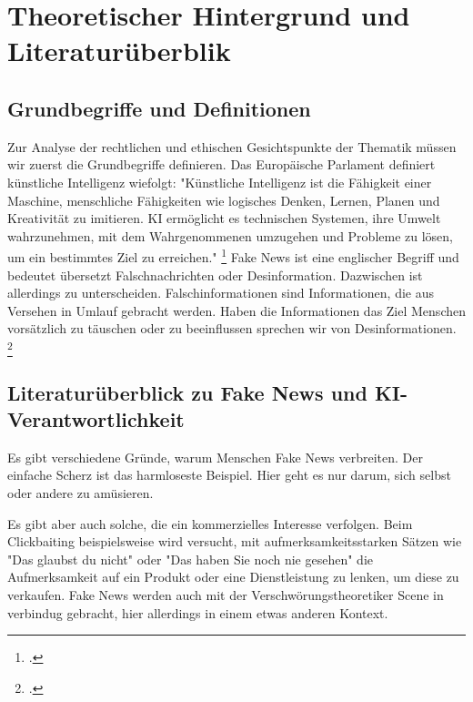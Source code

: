 \documentclass[Thesis.tex]{subfiles}
\begin{document}
\section{Theoretischer Hintergrund und Literaturüberblik}

\subsection{Grundbegriffe und Definitionen}
Zur Analyse der rechtlichen und ethischen Gesichtspunkte der Thematik müssen wir zuerst die Grundbegriffe definieren. 
Das Europäische Parlament definiert künstliche Intelligenz wiefolgt: "Künstliche Intelligenz ist die Fähigkeit einer Maschine,
menschliche Fähigkeiten wie logisches Denken, Lernen, Planen und Kreativität zu imitieren.
\ac{KI} ermöglicht es technischen Systemen, ihre Umwelt wahrzunehmen, mit dem Wahrgenommenen umzugehen
und Probleme zu lösen, um ein bestimmtes Ziel zu erreichen." \footcite{Parlament2020}
Fake News ist eine englischer Begriff und bedeutet übersetzt Falschnachrichten oder Desinformation. Dazwischen ist allerdings zu unterscheiden.
Falschinformationen sind Informationen, die aus Versehen in Umlauf gebracht werden.
Haben die Informationen das Ziel Menschen vorsätzlich zu täuschen oder zu beeinflussen sprechen wir von Desinformationen. \footcite{Bundesregierung2023Desinformation}

\subsection{Literaturüberblick zu Fake News und KI-Verantwortlichkeit}
Es gibt verschiedene Gründe, warum Menschen Fake News verbreiten. 
Der einfache Scherz ist das harmloseste Beispiel. Hier geht es nur darum, sich selbst
oder andere zu amüsieren.

Es gibt aber auch solche, die ein kommerzielles Interesse verfolgen. 
Beim Clickbaiting beispielsweise wird versucht, mit aufmerksamkeitsstarken Sätzen
wie "Das glaubst du nicht" oder "Das haben Sie noch nie gesehen" die Aufmerksamkeit
auf ein Produkt oder eine Dienstleistung zu lenken, um diese zu verkaufen. 
Fake News werden auch mit der Verschwörungstheoretiker Scene in verbindug gebracht, hier allerdings in einem etwas anderen Kontext.
\end{document}
